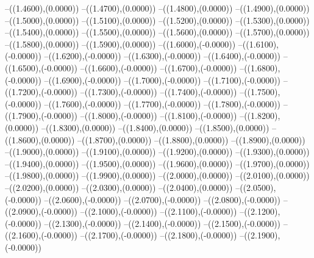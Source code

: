 {	--({\sx*(1.4600)},{\sy*(0.0000)})
	--({\sx*(1.4700)},{\sy*(0.0000)})
	--({\sx*(1.4800)},{\sy*(0.0000)})
	--({\sx*(1.4900)},{\sy*(0.0000)})
	--({\sx*(1.5000)},{\sy*(0.0000)})
	--({\sx*(1.5100)},{\sy*(0.0000)})
	--({\sx*(1.5200)},{\sy*(0.0000)})
	--({\sx*(1.5300)},{\sy*(0.0000)})
	--({\sx*(1.5400)},{\sy*(0.0000)})
	--({\sx*(1.5500)},{\sy*(0.0000)})
	--({\sx*(1.5600)},{\sy*(0.0000)})
	--({\sx*(1.5700)},{\sy*(0.0000)})
	--({\sx*(1.5800)},{\sy*(0.0000)})
	--({\sx*(1.5900)},{\sy*(0.0000)})
	--({\sx*(1.6000)},{\sy*(-0.0000)})
	--({\sx*(1.6100)},{\sy*(-0.0000)})
	--({\sx*(1.6200)},{\sy*(-0.0000)})
	--({\sx*(1.6300)},{\sy*(-0.0000)})
	--({\sx*(1.6400)},{\sy*(-0.0000)})
	--({\sx*(1.6500)},{\sy*(-0.0000)})
	--({\sx*(1.6600)},{\sy*(-0.0000)})
	--({\sx*(1.6700)},{\sy*(-0.0000)})
	--({\sx*(1.6800)},{\sy*(-0.0000)})
	--({\sx*(1.6900)},{\sy*(-0.0000)})
	--({\sx*(1.7000)},{\sy*(-0.0000)})
	--({\sx*(1.7100)},{\sy*(-0.0000)})
	--({\sx*(1.7200)},{\sy*(-0.0000)})
	--({\sx*(1.7300)},{\sy*(-0.0000)})
	--({\sx*(1.7400)},{\sy*(-0.0000)})
	--({\sx*(1.7500)},{\sy*(-0.0000)})
	--({\sx*(1.7600)},{\sy*(-0.0000)})
	--({\sx*(1.7700)},{\sy*(-0.0000)})
	--({\sx*(1.7800)},{\sy*(-0.0000)})
	--({\sx*(1.7900)},{\sy*(-0.0000)})
	--({\sx*(1.8000)},{\sy*(-0.0000)})
	--({\sx*(1.8100)},{\sy*(-0.0000)})
	--({\sx*(1.8200)},{\sy*(0.0000)})
	--({\sx*(1.8300)},{\sy*(0.0000)})
	--({\sx*(1.8400)},{\sy*(0.0000)})
	--({\sx*(1.8500)},{\sy*(0.0000)})
	--({\sx*(1.8600)},{\sy*(0.0000)})
	--({\sx*(1.8700)},{\sy*(0.0000)})
	--({\sx*(1.8800)},{\sy*(0.0000)})
	--({\sx*(1.8900)},{\sy*(0.0000)})
	--({\sx*(1.9000)},{\sy*(0.0000)})
	--({\sx*(1.9100)},{\sy*(0.0000)})
	--({\sx*(1.9200)},{\sy*(0.0000)})
	--({\sx*(1.9300)},{\sy*(0.0000)})
	--({\sx*(1.9400)},{\sy*(0.0000)})
	--({\sx*(1.9500)},{\sy*(0.0000)})
	--({\sx*(1.9600)},{\sy*(0.0000)})
	--({\sx*(1.9700)},{\sy*(0.0000)})
	--({\sx*(1.9800)},{\sy*(0.0000)})
	--({\sx*(1.9900)},{\sy*(0.0000)})
	--({\sx*(2.0000)},{\sy*(0.0000)})
	--({\sx*(2.0100)},{\sy*(0.0000)})
	--({\sx*(2.0200)},{\sy*(0.0000)})
	--({\sx*(2.0300)},{\sy*(0.0000)})
	--({\sx*(2.0400)},{\sy*(0.0000)})
	--({\sx*(2.0500)},{\sy*(-0.0000)})
	--({\sx*(2.0600)},{\sy*(-0.0000)})
	--({\sx*(2.0700)},{\sy*(-0.0000)})
	--({\sx*(2.0800)},{\sy*(-0.0000)})
	--({\sx*(2.0900)},{\sy*(-0.0000)})
	--({\sx*(2.1000)},{\sy*(-0.0000)})
	--({\sx*(2.1100)},{\sy*(-0.0000)})
	--({\sx*(2.1200)},{\sy*(-0.0000)})
	--({\sx*(2.1300)},{\sy*(-0.0000)})
	--({\sx*(2.1400)},{\sy*(-0.0000)})
	--({\sx*(2.1500)},{\sy*(-0.0000)})
	--({\sx*(2.1600)},{\sy*(-0.0000)})
	--({\sx*(2.1700)},{\sy*(-0.0000)})
	--({\sx*(2.1800)},{\sy*(-0.0000)})
	--({\sx*(2.1900)},{\sy*(-0.0000)})
}
